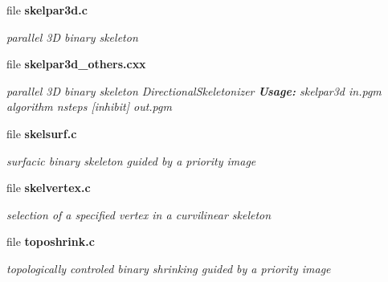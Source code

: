 \begin{CompactItemize}
\item 
file \bf{skelpar3d.c}
\begin{CompactList}\small\item\em parallel 3D binary skeleton \item\end{CompactList}

\item 
file \bf{skelpar3d\_\-others.cxx}
\begin{CompactList}\small\item\em parallel 3D binary skeleton Directional\-Skeletonizer {\bf Usage:} skelpar3d in.pgm algorithm nsteps [inhibit] out.pgm \item\end{CompactList}

\item 
file \bf{skelsurf.c}
\begin{CompactList}\small\item\em surfacic binary skeleton guided by a priority image \item\end{CompactList}

\item 
file \bf{skelvertex.c}
\begin{CompactList}\small\item\em selection of a specified vertex in a curvilinear skeleton \item\end{CompactList}

\item 
file \bf{toposhrink.c}
\begin{CompactList}\small\item\em topologically controled binary shrinking guided by a priority image \item\end{CompactList}

\end{CompactItemize}
